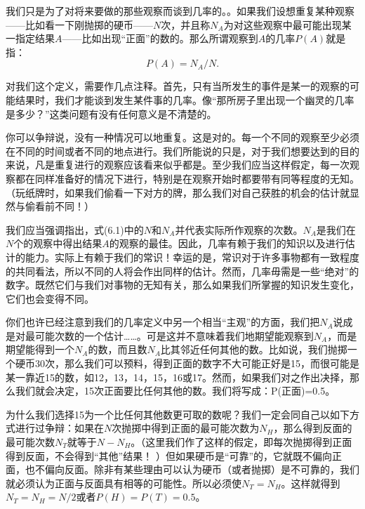 \documentclass[12pt,oneside]{book}
\begin{document}
\begin{common-format}
我们只是为了对将来要做的那些观察而谈到几率的。。如果我们设想重复某种观察——比如看一下刚抛掷的硬币——$N$次，并且称$N_A$为对这些观察中最可能出现某一指定结果$A$——比如出现“正面”的数的。那么所谓观察到$A$的几率$P(A)$就是指：
\begin{equation}
\label{Eq:I:6:1}
P(A)=N_A/N.
\end{equation}

对我们这个定义，需要作几点注释。首先，只有当所发生的事件是某一的观察的可能结果时，我们才能谈到发生某件事的几率。像“那所房子里出现一个幽灵的几率是多少？”这类问题有没有任何意义是不清楚的。

你可以争辩说，没有一种情况可以地重复。这是对的。每一个不同的观察至少必须在不同的时间或者不同的地点进行。我们所能说的只是，对于我们想要达到的目的来说，凡是重复进行的观察应该看来似乎都是。至少我们应当这样假定，每一次观察都在同样准备好的情况下进行，特别是在观察开始时都要带有同等程度的无知。（玩纸牌时，如果我们偷看一下对方的牌，那么我们对自己获胜的机会的估计就显然与偷看前不同！）

我们应当强调指出，式(6.1)中的$N$和$N_A$并代表实际所作观察的次数。$N_A$是我们在$N$个的观察中得出结果$A$的观察的最佳。因此，几率有赖于我们的知识以及进行估计的能力。实际上有赖于我们的常识！幸运的是，常识对于许多事物都有一致程度的共同看法，所以不同的人将会作出同样的估计。然而，几率毋需是一些“绝对”的数字。既然它们与我们对事物的无知有关，那么如果我们所掌握的知识发生变化，它们也会变得不同。

你们也许已经注意到我们的几率定义中另一个相当“主观”的方面，我们把$N_A$说成是对最可能次数的一个估计……。可是这并不意味着我们地期望能观察到$N_A$，而是期望能得到一个$N_A$的数，而且数$N_A$比其邻近任何其他的数。比如说，我们抛掷一个硬币$30$次，那么我们可以预料，得到正面的数字不大可能正好是15，而很可能是某一靠近15的数，如12，13，14，15，16或17。然而，如果我们对之作出决择，那么我们就会决定，15次正面要比任何其他的数。我们将写成：P(正面)=0.5。

为什么我们选择15为一个比任何其他数更可取的数呢？我们一定会同自己以如下方式进行过争辩：如果在$N$次抛掷中得到正面的最可能次数为$N_H$，那么得到反面的最可能次数$N_T$就等于$N-N_H$。（这里我们作了这样的假定，即每次抛掷得到正面得到反面，不会得到“其他”结果！ ）但如果硬币是“可靠”的，它就既不偏向正面，也不偏向反面。除非有某些理由可以认为硬币（或者抛掷）是不可靠的，我们就必须认为正面与反面具有相等的可能性。所以必须使$N_T=N_H$。这样就得到$N_T=N_H=N/2$或者$P(H)=P(T)=0.5$。


\end{common-format}
\end{document}
